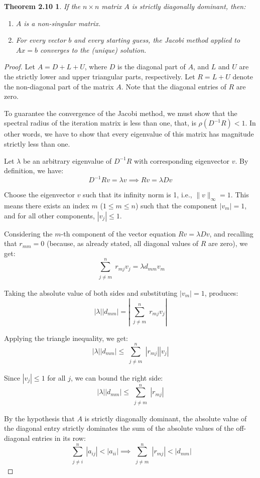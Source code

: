 \documentclass{article}
\newtheorem*{theorem210}{Theorem 2.10}
\begin{document}
\begin{theorem210}
If the $n \times n$ matrix $A$ is strictly diagonally dominant, then:
\begin{enumerate}
    \item $A$ is a non-singular matrix.
    \item For every vector $b$ and every starting guess, the Jacobi method applied to $Ax = b$ converges to the (unique) solution.
\end{enumerate}
\end{theorem210}

\begin{proof}
Let $A = D + L + U$, where $D$ is the diagonal part of $A$, and $L$ and $U$ are the strictly lower and upper triangular parts, respectively. Let $R = L + U$ denote the non-diagonal part of the matrix $A$. Note that the diagonal entries of $R$ are zero.

To guarantee the convergence of the Jacobi method, we must show that the spectral radius of the iteration matrix is less than one, that, is $\rho(D^{-1}R) < 1$. In other words, we have to show that every eigenvalue of this matrix has magnitude strictly less than one.

Let $\lambda$ be an arbitrary eigenvalue of $D^{-1}R$ with corresponding eigenvector $v$. By definition, we have:
\[
D^{-1}Rv = \lambda v \implies Rv = \lambda Dv
\]

Choose the eigenvector $v$ such that its infinity norm is 1, i.e., $\|v\|_\infty = 1$. This means there exists an index $m$ ($1 \le m \le n$) such that the component $|v_m| = 1$, and for all other components, $|v_j| \le 1$.

Considering the $m$-th component of the vector equation $Rv = \lambda Dv$, and recalling that $r_{mm} = 0$ (because, as already stated, all diagonal values of $R$ are zero), we get:
\[
\sum_{\substack{j \neq m}}^{n} r_{mj}v_j = \lambda d_{mm}v_m
\]

Taking the absolute value of both sides and substituting $|v_m| = 1$, produces:
\[
|\lambda| |d_{mm}| = \left| \sum_{\substack{j \neq m}}^{n} r_{mj}v_j \right|\]

Applying the triangle inequality, we get:
\[
|\lambda| |d_{mm}| \le \sum_{\substack{j \neq m}}^{n} |r_{mj}| |v_j|
\]

Since $|v_j| \le 1$ for all $j$, we can bound the right side:
\[
|\lambda| |d_{mm}| \le \sum_{\substack{j \neq m}}^{n} |r_{mj}|
\]

By the hypothesis that $A$ is strictly diagonally dominant, the absolute value of the diagonal entry strictly dominates the sum of the absolute values of the off-diagonal entries in its row:
\[
\sum_{\substack{j \neq i}}^{n} |a_{ij}| < |a_{ii}| \implies \sum_{\substack{j \neq m}}^{n} |r_{mj}| < |d_{mm}|
\]


\end{proof}
\end{document}
